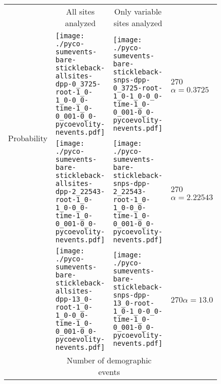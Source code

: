\documentclass[border=10pt,varwidth=30cm]{standalone}
\begin{document}
\begin{figure}
    \centering
    \begin{tabular}{@{}llll@{}}
        & \multicolumn{1}{c}{All sites analyzed} & \multicolumn{1}{c}{Only variable sites analyzed} & \\
        \multirow{2}{*}[2em]{\begin{sideways}\large Probability\end{sideways}}
        & \texttt{[image: ./pyco-sumevents-bare-stickleback-allsites-dpp-0\_3725-root-1\_0-1\_0-0\_0-time-1\_0-0\_001-0\_0-pycoevolity-nevents.pdf]}
        & \texttt{[image: ./pyco-sumevents-bare-stickleback-snps-dpp-0\_3725-root-1\_0-1\_0-0\_0-time-1\_0-0\_001-0\_0-pycoevolity-nevents.pdf]}
        & \multirow{1}{*}[11.5em]{\begin{rotate}{270}$\alpha = 0.3725$\end{rotate}} \\
        & \texttt{[image: ./pyco-sumevents-bare-stickleback-allsites-dpp-2\_22543-root-1\_0-1\_0-0\_0-time-1\_0-0\_001-0\_0-pycoevolity-nevents.pdf]}
        & \texttt{[image: ./pyco-sumevents-bare-stickleback-snps-dpp-2\_22543-root-1\_0-1\_0-0\_0-time-1\_0-0\_001-0\_0-pycoevolity-nevents.pdf]}
        & \multirow{1}{*}[11.5em]{\begin{rotate}{270}$\alpha = 2.22543$\end{rotate}} \\
        & \texttt{[image: ./pyco-sumevents-bare-stickleback-allsites-dpp-13\_0-root-1\_0-1\_0-0\_0-time-1\_0-0\_001-0\_0-pycoevolity-nevents.pdf]}
        & \texttt{[image: ./pyco-sumevents-bare-stickleback-snps-dpp-13\_0-root-1\_0-1\_0-0\_0-time-1\_0-0\_001-0\_0-pycoevolity-nevents.pdf]}
        & \multirow{1}{*}[11.5em]{\begin{rotate}{270}$\alpha = 13.0$\end{rotate}} \\
        & \multicolumn{2}{c}{\large Number of demographic events} & 
    \end{tabular}
\end{figure}
\end{document}
